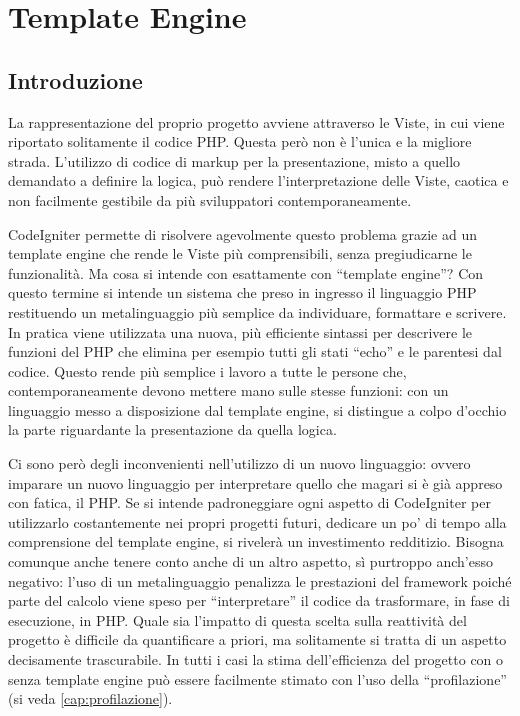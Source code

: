 \chapter{Template Engine}
\label{cap:template}

\section{Introduzione}
La rappresentazione del proprio progetto avviene attraverso le Viste, in cui viene riportato solitamente il codice \ac{PHP}. Questa però non è l'unica e la migliore strada. L'utilizzo di codice di markup per la presentazione, misto a quello demandato a definire la logica, può rendere l'interpretazione delle Viste, caotica e non facilmente gestibile da più sviluppatori contemporaneamente.

CodeIgniter permette di risolvere agevolmente questo problema grazie ad un template engine che rende le Viste più comprensibili, senza pregiudicarne le funzionalità. Ma cosa si intende con esattamente con ``template engine''? Con questo termine si intende un sistema che preso in ingresso il linguaggio \ac{PHP} restituendo un metalinguaggio più semplice da individuare, formattare e scrivere. In pratica viene utilizzata una nuova, più efficiente sintassi per descrivere le funzioni del \ac{PHP} che elimina per esempio tutti gli stati ``echo'' e le parentesi dal codice. Questo rende più semplice i lavoro a tutte le persone che, contemporaneamente devono mettere mano sulle stesse funzioni: con un linguaggio messo a disposizione dal template engine, si distingue a colpo d'occhio la parte riguardante la presentazione da quella logica.

Ci sono però degli inconvenienti nell'utilizzo di un nuovo linguaggio: ovvero imparare un nuovo linguaggio per interpretare quello che magari si è già appreso con fatica, il \ac{PHP}. Se si intende padroneggiare ogni aspetto di CodeIgniter per utilizzarlo costantemente nei propri progetti futuri, dedicare un po' di tempo alla comprensione del template engine, si rivelerà un investimento redditizio. Bisogna comunque anche tenere conto anche di un altro aspetto, sì purtroppo anch'esso negativo: l'uso di un metalinguaggio penalizza le prestazioni del framework poiché parte del calcolo viene speso per ``interpretare'' il codice da trasformare, in fase di esecuzione, in \ac{PHP}. Quale sia l'impatto di questa scelta sulla reattività del progetto è difficile da quantificare a priori, ma solitamente si tratta di un aspetto decisamente trascurabile. In tutti i casi la stima dell'efficienza del progetto con o senza template engine può essere facilmente stimato con l'uso della ``profilazione'' (si veda \vref{cap:profilazione}).



